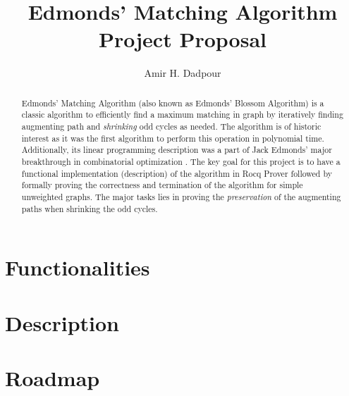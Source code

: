 \documentclass[acmsmall, screen, nonacm]{acmart}
\begin{document}
\title{Edmonds' Matching Algorithm Project Proposal}
\author{Amir H. Dadpour}


\begin{abstract}
	Edmonds' Matching Algorithm (also known as Edmonds' Blossom Algorithm) \cite{Edmonds1965} is a classic algorithm to efficiently find a maximum matching in graph by iteratively finding augmenting path and \textit{shrinking} odd cycles as needed. The algorithm is of historic interest as it was the first algorithm to perform this operation in polynomial time. Additionally, its linear programming description was a part of Jack Edmonds' major breakthrough in combinatorial optimization \cite{Edmonds1965MA}.
	The key goal for this project is to have a functional implementation (description) of the algorithm in Rocq Prover followed by formally proving the correctness and termination of the algorithm for simple unweighted graphs. The major tasks lies in proving the \textit{preservation} of the augmenting paths when shrinking the odd cycles.
\end{abstract}


\maketitle

\section{Functionalities}

\section{Description}


\section{Roadmap}


{}
\end{document}
